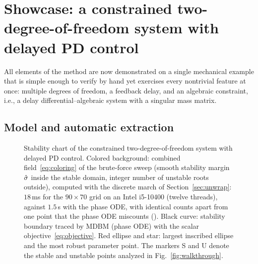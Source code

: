 \section{Showcase: a constrained two-degree-of-freedom system with delayed PD control}\label{sec:showcase}

All elements of the method are now demonstrated on a single mechanical
example that is simple enough to verify by hand yet exercises every
nontrivial feature at once: multiple degrees of freedom, a feedback delay,
and an algebraic constraint, i.e., a delay differential--algebraic system
with a singular mass matrix.

\subsection{Model and automatic extraction}\label{sec:showcase-model}

\begin{figure}[tb]
  \centering
  \caption{Stability chart of the constrained two-degree-of-freedom system
  with delayed PD control. Colored background: combined
  field~\eqref{eq:coloring} of the brute-force sweep (smooth stability margin
  $\hat{\sigma}$ inside the stable domain, integer number of unstable roots
  outside), computed with the discrete march of Section~\ref{sec:unwrap}:
  $18$\,ms for the $90\times70$ grid on an Intel i5-10400 (twelve threads),
  against $1.5$\,s with the phase ODE, with identical counts apart from one
  point that the phase ODE miscounts ().
  Black curve: stability boundary traced by MDBM (phase ODE) with the scalar
  objective~\eqref{eq:objective}. Red ellipse and star: largest inscribed
  ellipse and the most robust parameter point. The markers S and U denote
  the stable and unstable points analyzed in
  Fig.~\ref{fig:walkthrough}.}\label{fig:showcase}
\end{figure}

